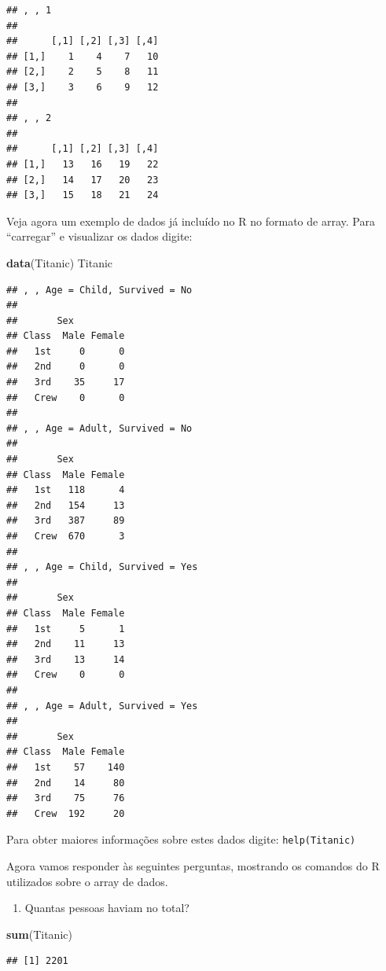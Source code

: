 \documentclass[
]{book}
\newenvironment{Shaded}{\begin{snugshade}}{\end{snugshade}}
\newcommand{\KeywordTok}[1]{\textcolor[rgb]{0.13,0.29,0.53}{\textbf{#1}}}
\newcommand{\NormalTok}[1]{#1}
\providecommand{\tightlist}{%
  \setlength{\itemsep}{0pt}\setlength{\parskip}{0pt}}
\begin{document}
\begin{verbatim}
## , , 1
## 
##      [,1] [,2] [,3] [,4]
## [1,]    1    4    7   10
## [2,]    2    5    8   11
## [3,]    3    6    9   12
## 
## , , 2
## 
##      [,1] [,2] [,3] [,4]
## [1,]   13   16   19   22
## [2,]   14   17   20   23
## [3,]   15   18   21   24
\end{verbatim}

Veja agora um exemplo de dados já incluído no R no formato de array. Para ``carregar'' e visualizar os dados digite:

\begin{Shaded}
\begin{Highlighting}[]
\KeywordTok{data}\NormalTok{(Titanic) }
\NormalTok{Titanic}
\end{Highlighting}
\end{Shaded}

\begin{verbatim}
## , , Age = Child, Survived = No
## 
##       Sex
## Class  Male Female
##   1st     0      0
##   2nd     0      0
##   3rd    35     17
##   Crew    0      0
## 
## , , Age = Adult, Survived = No
## 
##       Sex
## Class  Male Female
##   1st   118      4
##   2nd   154     13
##   3rd   387     89
##   Crew  670      3
## 
## , , Age = Child, Survived = Yes
## 
##       Sex
## Class  Male Female
##   1st     5      1
##   2nd    11     13
##   3rd    13     14
##   Crew    0      0
## 
## , , Age = Adult, Survived = Yes
## 
##       Sex
## Class  Male Female
##   1st    57    140
##   2nd    14     80
##   3rd    75     76
##   Crew  192     20
\end{verbatim}

Para obter maiores informações sobre estes dados digite: \texttt{help(Titanic)}

Agora vamos responder às seguintes perguntas, mostrando os comandos do R utilizados sobre o array de dados.

\begin{enumerate}
\def\labelenumi{\arabic{enumi}.}
\tightlist
\item
  Quantas pessoas haviam no total?
\end{enumerate}

\begin{Shaded}
\begin{Highlighting}[]
\KeywordTok{sum}\NormalTok{(Titanic)}
\end{Highlighting}
\end{Shaded}

\begin{verbatim}
## [1] 2201
\end{verbatim}
\end{document}
